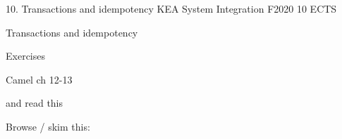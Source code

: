 \documentclass[Screen16to9,17pt]{foils}
\begin{document}
\mytitlepage
{10. Transactions and idempotency}
{KEA System Integration F2020 10 ECTS}


\begin{list2}
\item
Transactions and idempotency


\item
\item
\end{list2}

Exercises
\begin{list2}
\item
\item
\end{list2}




\begin{list1}
\item Camel ch 12-13

and read this\\

\item Browse / skim this:\\

\end{list1}




\slidenext
\end{document}
